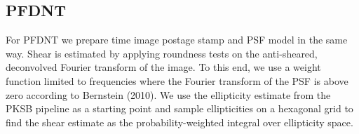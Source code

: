 \subsection{PFDNT}
For PFDNT we prepare time image postage stamp and PSF model in the
same way. Shear is estimated by applying roundness tests on the
anti-sheared, deconvolved Fourier transform of the image. To this end,
we use a weight function limited to frequencies where the Fourier
transform of the PSF is above zero according to Bernstein (2010). We
use the ellipticity estimate from the PKSB pipeline as a starting
point and sample ellipticities on a hexagonal grid to find the shear
estimate as the probability-weighted integral over ellipticity
space. \\

